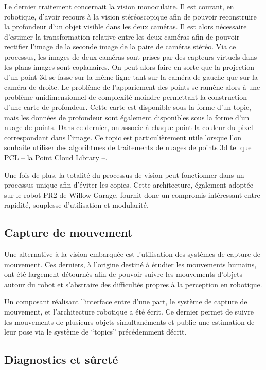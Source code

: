 Le dernier traitement concernait la vision monoculaire. Il est
courant, en robotique, d'avoir recours à la vision stéréoscopique afin
de pouvoir reconstruire la profondeur d'un objet visible dans les deux
caméras. Il est alors nécessaire d'estimer la transformation relative
entre les deux caméras afin de pouvoir rectifier l'image de la seconde
image de la paire de caméras stéréo. Via ce processus, les images de
deux caméras sont prises par des capteurs virtuels dans les plans
images sont coplanaires. On peut alors faire en sorte que la
projection d'un point 3d se fasse sur la même ligne tant sur la caméra
de gauche que sur la caméra de droite. Le problème de l'appariement
des points se ramène alors à une problème unidimensionnel de
complexité moindre permettant la construction d'une carte de
profondeur. Cette carte est disponible sous la forme d'un topic, mais
les données de profondeur sont également disponibles sous la forme
d'un nuage de points. Dans ce dernier, on associe à chaque point la
couleur du pixel correspondant dans l'image. Ce topic est
particulièrement utile lorsque l'on souhaite utiliser des algorihtmes
de traitements de nuages de points 3d tel que PCL -- la Point Cloud
Library --.


Une fois de plus, la totalité du processus de vision peut fonctionner
dans un processus unique afin d'éviter les copies. Cette architecture,
également adoptée sur le robot PR2 de Willow Garage, fournit donc un
compromis intéressant entre rapidité, souplesse d'utilisation et
modularité.


\subsection{Capture de mouvement}

Une alternative à la vision embarquée est l'utilisation des systèmes
de capture de mouvement. Ces derniers, à l'origine destiné à étudier
les mouvements humains, ont été largement détournés afin de pouvoir
suivre les mouvements d'objets autour du robot et s'abstraire des
difficultés propres à la perception en robotique.


Un composant réalisant l'interface entre d'une part, le système de
capture de mouvement, et l'architecture robotique a été écrit. Ce
dernier permet de suivre les mouvements de plusieurs objets
simultanéments et publie une estimation de leur pose via le système de
``topics'' précédemment décrit.


\subsection{Diagnostics et sûreté}

